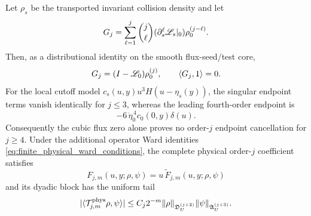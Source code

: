 \begin{theorem}
\label{thm:supp_complete_physical_ward_hierarchy}
Let \(\rho_s\) be the transported invariant collision density and let
\[
  G_j
  =
  \sum_{\ell=1}^j\binom j\ell
  (\partial_s^\ell\mathscr L_s|_0)\rho^{(j-\ell)}_0 .
\]
Then, as a distributional identity on the smooth flux-seed/test core,
\begin{equation}
\label{eq:supp_global_ward_identity}
  G_j=(I-\mathscr L_0)\rho^{(j)}_0,
  \qquad
  \langle G_j,1\rangle=0 .
\end{equation}
For the local cutoff model \(c_s(u,y)u^3H(u-\eta_s(y))\), the singular
endpoint terms vanish identically for \(j\le3\), whereas the leading
fourth-order endpoint is
\begin{equation}
\label{eq:supp_fourth_order_cubic_endpoint}
  -6\,\dot\eta_0^{\,4}c_0(0,y)\delta(u).
\end{equation}
Consequently the cubic flux zero alone proves no order-\(j\) endpoint
cancellation for \(j\ge4\).  Under the additional operator Ward identities
\eqref{eq:finite_physical_ward_conditions}, the complete physical order-\(j\)
coefficient satisfies
\[
  F_{j,m}(u,y;\rho,\psi)
  =u\,\widetilde F_{j,m}(u,y;\rho,\psi)
\]
and its dyadic block has the uniform tail
\begin{equation}
\label{eq:supp_complete_physical_block_tail}
  |\langle\mathcal T_{j,m}^{\rm phys}\rho,\psi\rangle|
  \le
  C_j2^{-m}
  \|\rho\|_{\mathfrak D_U^{(j+2)}}
  \|\psi\|_{\mathfrak A_U^{(j+3)}} .
\end{equation}
\end{theorem}

